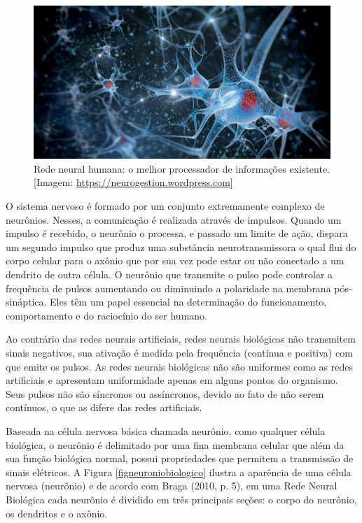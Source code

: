 \begin{figure}[ht]
\centering
\includegraphics[width=1\textwidth]{figuras/axons.jpg}
\caption{Rede neural humana: o melhor processador de informações existente. [Imagem: \href{ https://neurogestion.wordpress.com}{ https://neurogestion.wordpress.com}]}
\label{figneuronios}
\end{figure}

O sistema nervoso é formado por um conjunto extremamente complexo de neurônios. Nesses, a comunicação é realizada através de impulsos. Quando um impulso é recebido, o neurônio o processa, e passado um limite de ação, dispara um segundo impulso que produz uma substância neurotransmissora o qual flui do corpo celular para o axônio que por sua vez pode estar ou não conectado a um dendrito de outra célula. O neurônio que transmite o pulso pode controlar a frequência de pulsos aumentando ou diminuindo a polaridade na membrana pós-sináptica. Eles têm um papel essencial na determinação do funcionamento, comportamento e do raciocínio do ser humano. 

Ao contrário das redes neurais artificiais, redes neurais biológicas não transmitem sinais negativos, sua ativação é medida pela frequência (contínua e positiva) com que emite os pulsos. As redes neurais biológicas não são uniformes como as redes artificiais e apresentam uniformidade apenas em alguns pontos do organismo. Seus pulsos não são síncronos ou assíncronos, devido ao fato de não serem contínuos, o que as difere das redes artificiais. 

Baseada na célula nervosa básica chamada neurônio, como qualquer célula biológica, o neurônio é delimitado por uma fina membrana celular que além da sua função biológica normal, possui propriedades que permitem a transmissão de sinais elétricos. A Figura \ref{figneuroniobiologico} ilustra a aparência de uma célula nervosa (neurônio) e de acordo  com  Braga  (2010,  p.  5),  em  uma  Rede  Neural  Biológica cada neurônio é dividido em três principais seções: o corpo do neurônio, os dendritos e o axônio.

